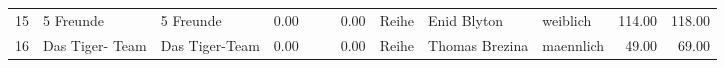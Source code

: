 \begin{table}
\begin{center}
{\begin{tabular}{rllrllrlllrr}
  15 & 5 Freunde                                                                                                                                                                                                                                                       & 5 Freunde                                                                                                                                                                                                                                                       & 0.00 &                                                                                                                                                                                                                                                                 &                                                                                                                                                                                                                                                                 & 0.00 & Reihe & Enid Blyton                                                                                                                                                                                                                                                     & weiblich & 114.00 & 118.00 \\ 
  16 & Das Tiger- Team                                                                                                                                                                                                                                                 & Das Tiger-Team                                                                                                                                                                                                                                                  & 0.00 &                                                                                                                                                                                                                                                                 &                                                                                                                                                                                                                                                                 & 0.00 & Reihe & Thomas Brezina                                                                                                                                                                                                                                                  & maennlich & 49.00 & 69.00 \\ 

\end{tabular}}
\end{center}
\end{table}

